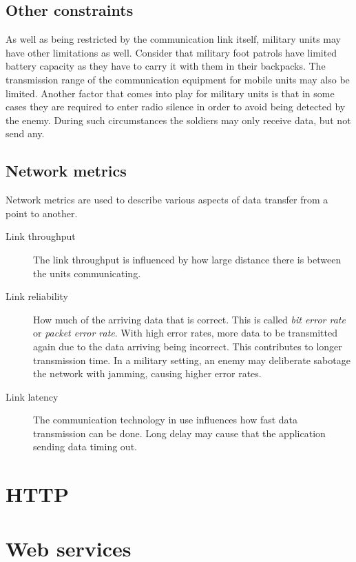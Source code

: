 \subsection{Other constraints}

As well as being restricted  by the communication link itself, military units
may have other limitations as well. Consider that military foot patrols have
limited battery capacity as they have to carry it with them in their
backpacks. The transmission range of the communication equipment for mobile
units may also be limited. Another factor that comes into play for military
units is that in some cases they are required to enter radio silence in order
to avoid being detected by the enemy. During such circumstances the soldiers
may only receive data, but not send any.


\subsection{Network metrics}

Network metrics are used to describe various aspects of data transfer from a
point to another.

\begin{description}

\item[Link throughput] The link throughput is influenced by how large distance
there is between the units communicating.

\item[Link reliability] How much of the arriving data that is correct. This is
called \textit{bit error rate} or \textit{packet error rate}. With high error
rates, more data to be transmitted again due to the data arriving being
incorrect. This contributes to longer transmission time. In a military setting,
an enemy may deliberate sabotage the network with jamming, causing higher error
rates.

\item[Link latency] The communication technology in use influences how fast data
transmission can be done. Long delay may cause that the application sending data
timing out.

\end{description}


\section{HTTP}


\section{Web services}
\label{web-services}

